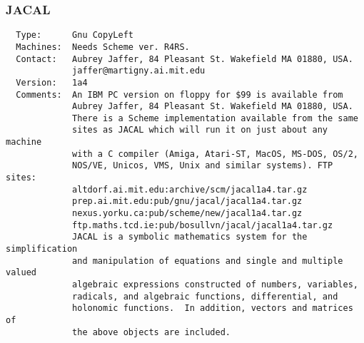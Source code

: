 \subsubsection{JACAL}
\begin{verbatim}
  Type:      Gnu CopyLeft
  Machines:  Needs Scheme ver. R4RS.
  Contact:   Aubrey Jaffer, 84 Pleasant St. Wakefield MA 01880, USA.
             jaffer@martigny.ai.mit.edu
  Version:   1a4
  Comments:  An IBM PC version on floppy for $99 is available from
             Aubrey Jaffer, 84 Pleasant St. Wakefield MA 01880, USA.
             There is a Scheme implementation available from the same
             sites as JACAL which will run it on just about any machine
             with a C compiler (Amiga, Atari-ST, MacOS, MS-DOS, OS/2,
             NOS/VE, Unicos, VMS, Unix and similar systems). FTP sites:
             altdorf.ai.mit.edu:archive/scm/jacal1a4.tar.gz
             prep.ai.mit.edu:pub/gnu/jacal/jacal1a4.tar.gz
             nexus.yorku.ca:pub/scheme/new/jacal1a4.tar.gz
             ftp.maths.tcd.ie:pub/bosullvn/jacal/jacal1a4.tar.gz
             JACAL is a symbolic mathematics system for the simplification
             and manipulation of equations and single and multiple valued
             algebraic expressions constructed of numbers, variables,
             radicals, and algebraic functions, differential, and
             holonomic functions.  In addition, vectors and matrices of
             the above objects are included.
\end{verbatim}

